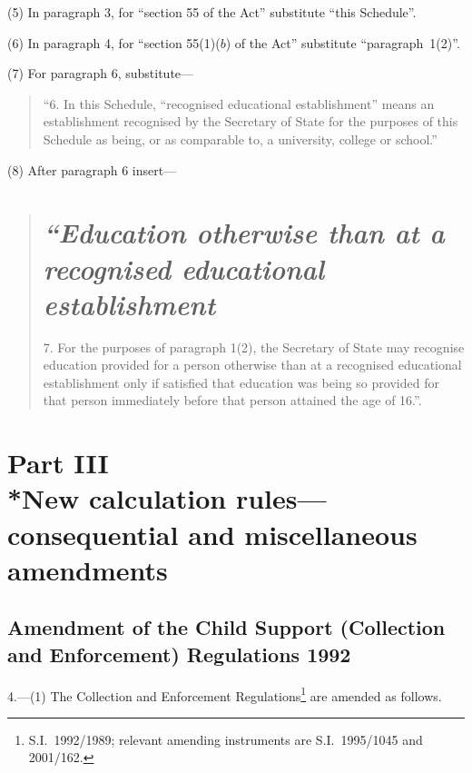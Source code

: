 \documentclass[12pt,a4paper]{article}
\begin{document}
(5) In paragraph 3, for “section 55 of the Act” substitute “this Schedule”.

(6) In paragraph 4, for “section 55(1)($b$)  of the Act” substitute “paragraph~1(2)”.

(7) For paragraph 6, substitute—
\begin{quotation}
“6.  In this Schedule, “recognised educational establishment” means an establishment recognised by the Secretary of State for the purposes of this Schedule as being, or as comparable to, a university, college or school.”
\end{quotation}

(8) After paragraph 6 insert—
\begin{quotation}
\section*{\itshape “Education otherwise than at a recognised educational establishment}

7.  For the purposes of paragraph 1(2), the Secretary of State may recognise education provided for a person otherwise than at a recognised educational establishment only if satisfied that education was being so provided for that person immediately before that person attained the age of 16.”.
\end{quotation}

\section[Part III --- New calculation rules---consequential and miscellaneous amendments]{Part III\\*New calculation rules---consequential and miscellaneous amendments}

\renewcommand\parthead{--- Part III}

\subsection[4. Amendment of the Child Support (Collection and Enforcement) Regulations 1992]{Amendment of the Child Support (Collection and Enforcement) Regulations 1992}

4.---(1)  The Collection and Enforcement Regulations\footnote{S.I.~1992/1989; relevant amending instruments are S.I.~1995/1045 and 2001/162.} are amended as follows.
\end{document}
